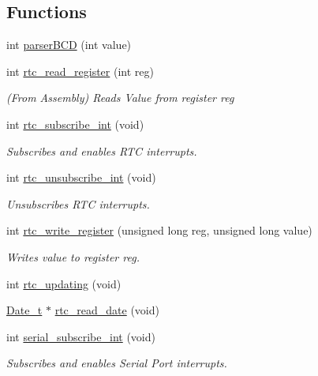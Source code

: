 \subsection*{Functions}
\begin{DoxyCompactItemize}
\item 
int \hyperlink{group___serial_gab77fc689b79cf1fa098f71a4ff5abdeb}{parser\+B\+CD} (int value)
\item 
int \hyperlink{group___serial_ga50431f28993883d49a09ce054bd5c0ec}{rtc\+\_\+read\+\_\+register} (int reg)
\begin{DoxyCompactList}\small\item\em (From Assembly) Reads Value from register reg \end{DoxyCompactList}\item 
int \hyperlink{group___serial_ga6bd13bd1e0cd043f50abb97bcc138bfa}{rtc\+\_\+subscribe\+\_\+int} (void)
\begin{DoxyCompactList}\small\item\em Subscribes and enables R\+TC interrupts. \end{DoxyCompactList}\item 
int \hyperlink{group___serial_ga5b1cba4be2c15183b9f2c089fe6e946a}{rtc\+\_\+unsubscribe\+\_\+int} (void)
\begin{DoxyCompactList}\small\item\em Unsubscribes R\+TC interrupts. \end{DoxyCompactList}\item 
int \hyperlink{group___serial_gab88c07eaefdae0ccbae9e7c2a1e04f71}{rtc\+\_\+write\+\_\+register} (unsigned long reg, unsigned long value)
\begin{DoxyCompactList}\small\item\em Writes value to register reg. \end{DoxyCompactList}\item 
int \hyperlink{group___serial_gacaae78073772a1f95560e42cef087a93}{rtc\+\_\+updating} (void)
\item 
\hyperlink{struct_date__t}{Date\+\_\+t} $\ast$ \hyperlink{group___serial_ga08a02c163edf9dc74b2d15dfb23a2624}{rtc\+\_\+read\+\_\+date} (void)
\item 
int \hyperlink{group___serial_ga31328528e82730ef05d9e6121447dd42}{serial\+\_\+subscribe\+\_\+int} (void)
\begin{DoxyCompactList}\small\item\em Subscribes and enables Serial Port interrupts. \end{DoxyCompactList}\item 

\end{DoxyCompactItemize}
